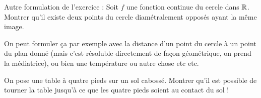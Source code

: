 \begin{exo}[Le Périph']
\begin{sol}
Autre formulation de l'exercice  : Soit $f$ une fonction continue du cercle dans $\mathbb R$. Montrer qu'il existe deux points du cercle diamétralement opposés ayant la même image.

On peut formuler ça par exemple avec la distance d'un point du cercle à un point du plan donné (mais c'est résoluble directement de façon géométrique, on prend la médiatrice), ou bien une température ou autre chose etc etc.
\end{sol}
\end{exo}


\begin{exo}
On pose une table à quatre pieds sur un sol cabossé. Montrer qu'il est possible de tourner la table jusqu'à ce que les quatre pieds soient au contact du sol !
\end{exo}


